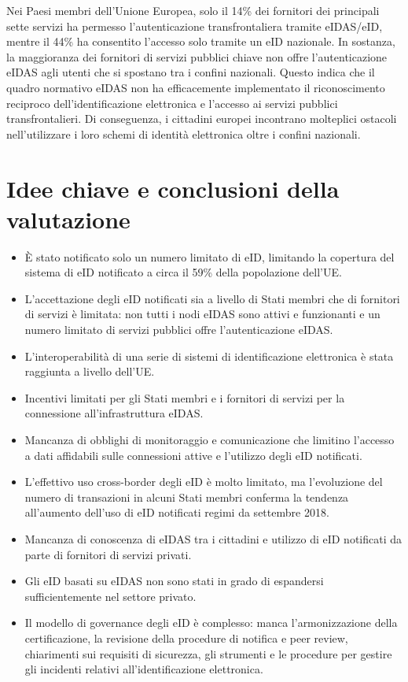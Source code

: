 Nei Paesi membri dell'Unione Europea, solo il 14\% dei fornitori dei principali sette servizi ha permesso l'autenticazione transfrontaliera tramite eIDAS/eID, mentre il 44\% ha consentito l'accesso solo tramite un eID nazionale. In sostanza, la maggioranza dei fornitori di servizi pubblici chiave non offre l'autenticazione eIDAS agli utenti che si spostano tra i confini nazionali. Questo indica che il quadro normativo eIDAS non ha efficacemente implementato il riconoscimento reciproco dell'identificazione elettronica e l'accesso ai servizi pubblici transfrontalieri. Di conseguenza, i cittadini europei incontrano molteplici ostacoli nell'utilizzare i loro schemi di identità elettronica oltre i confini nazionali.
\section{Idee chiave e conclusioni della valutazione}
\begin{itemize}
    \item È stato notificato solo un numero limitato di eID, limitando la copertura del sistema di eID notificato
    a circa il 59\% della popolazione dell'UE.
    \item L'accettazione degli eID notificati sia a livello di Stati membri che di fornitori di servizi è limitata: non tutti i nodi eIDAS sono attivi e funzionanti e un numero limitato di servizi pubblici offre l'autenticazione eIDAS.
    \item L'interoperabilità di una serie di sistemi di identificazione elettronica è stata raggiunta a livello dell'UE.
    \item Incentivi limitati per gli Stati membri e i fornitori di servizi per la connessione all'infrastruttura eIDAS.
    \item Mancanza di obblighi di monitoraggio e comunicazione che limitino l'accesso a dati affidabili sulle connessioni attive e l'utilizzo degli eID notificati.
    \item L'effettivo uso cross-border degli eID è molto limitato, ma l'evoluzione del numero di
    transazioni in alcuni Stati membri conferma la tendenza all'aumento dell'uso di eID notificati
    regimi da settembre 2018.
    \item Mancanza di conoscenza di eIDAS tra i cittadini e utilizzo di eID notificati da parte di fornitori di servizi privati.
    \item Gli eID basati su eIDAS non sono stati in grado di espandersi sufficientemente nel settore privato.
    \item Il modello di governance degli eID è complesso: manca l'armonizzazione della certificazione, la revisione della
    procedure di notifica e peer review, chiarimenti sui requisiti di sicurezza, gli strumenti e le procedure per gestire gli incidenti relativi all'identificazione elettronica.
    
\end{itemize}